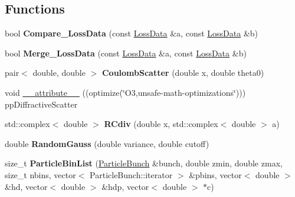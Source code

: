 \subsection*{Functions}
\begin{DoxyCompactItemize}
\item 
\mbox{\label{namespaceParticleTracking_ab3fe086e8f7d2b9a85ea050ee7356ce2}} 
bool {\bfseries Compare\+\_\+\+Loss\+Data} (const \hyperlink{structParticleTracking_1_1LossData}{Loss\+Data} \&a, const \hyperlink{structParticleTracking_1_1LossData}{Loss\+Data} \&b)
\item 
\mbox{\label{namespaceParticleTracking_a777d8d2f97aec89c888dbb79e40c4749}} 
bool {\bfseries Merge\+\_\+\+Loss\+Data} (const \hyperlink{structParticleTracking_1_1LossData}{Loss\+Data} \&a, const \hyperlink{structParticleTracking_1_1LossData}{Loss\+Data} \&b)
\item 
\mbox{\label{namespaceParticleTracking_a602f01e943e647f899a2e31bb44d86c2}} 
pair$<$ double, double $>$ {\bfseries Coulomb\+Scatter} (double x, double theta0)
\item 
void \hyperlink{namespaceParticleTracking_a1064dfa4c548a311ce007c08f0f3a17b}{\+\_\+\+\_\+attribute\+\_\+\+\_\+} ((optimize(\char`\"{}O3,unsafe-\/math-\/optimizations\char`\"{}))) pp\+Diffractive\+Scatter
\item 
\mbox{\label{namespaceParticleTracking_a58dbcb50d0dd44b94cf1b58680b3d190}} 
std\+::complex$<$ double $>$ {\bfseries R\+Cdiv} (double x, std\+::complex$<$ double $>$ a)
\item 
\mbox{\label{namespaceParticleTracking_a85a65a0c5e75e7615ff1fdd71f143225}} 
double {\bfseries Random\+Gauss} (double variance, double cutoff)
\item 
\mbox{\label{namespaceParticleTracking_aba701b28224e5a3be0640df27162ee99}} 
size\+\_\+t {\bfseries Particle\+Bin\+List} (\hyperlink{classParticleTracking_1_1ParticleBunch}{Particle\+Bunch} \&bunch, double zmin, double zmax, size\+\_\+t nbins, vector$<$ Particle\+Bunch\+::iterator $>$ \&pbins, vector$<$ double $>$ \&hd, vector$<$ double $>$ \&hdp, vector$<$ double $>$ $\ast$c)
\item 

\end{DoxyCompactItemize}
